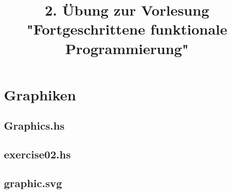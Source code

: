 \documentclass[a4paper]{article}
\title{2. Übung zur Vorlesung "Fortgeschrittene funktionale Programmierung"}
\begin{document}
\maketitle

\section{Graphiken}

\subsection{Graphics.hs}


\subsection{exercise02.hs}


\subsection{graphic.svg}

\end{document}

